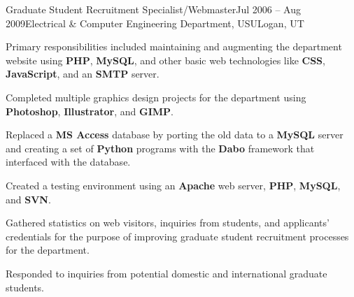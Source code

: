
\def\PositionTitle{Graduate Student Recruitment Specialist/Webmaster}
\def\PositionPeriod{Jul 2006 -- Aug 2009} %
\def\OrgName{Electrical \& Computer Engineering Department, USU}
\def\OrgLocation{Logan, UT}


\begin{rExperience}{\PositionTitle}{\PositionPeriod}{\OrgName}{\OrgLocation}

  \item Primary responsibilities included maintaining and augmenting the department website using \textbf{PHP}, \textbf{MySQL}, and other basic web technologies like \textbf{CSS}, \textbf{JavaScript}, and an \textbf{SMTP} server.

  \item Completed multiple graphics design projects for the department using \textbf{Photoshop}, \textbf{Illustrator}, and \textbf{GIMP}.

  \begin{CVonly}

  \item Replaced a \textbf{MS Access} database by porting the old data to a \textbf{MySQL} server and creating a set of \textbf{Python} programs with the \textbf{Dabo} framework that interfaced with the database.


  \item Created a testing environment using an \textbf{Apache} web server, \textbf{PHP}, \textbf{MySQL}, and \textbf{SVN}.

  \item Gathered statistics on web visitors, inquiries from students, and applicants' credentials for the purpose of improving graduate student recruitment processes for the department.

  \item Responded to inquiries from potential domestic and international graduate students.

  \end{CVonly}

\end{rExperience}
